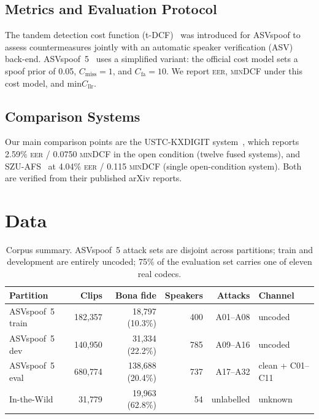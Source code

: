 \documentclass{llncs}
\newcommand{\eer}{\textsc{eer}}
\newcommand{\mindcf}{\textsc{minDCF}}
\begin{document}
\subsection{Metrics and Evaluation Protocol}

The tandem detection cost function (t-DCF)~\cite{tdcf} was introduced for
ASVspoof to assess countermeasures jointly with an automatic speaker verification
(ASV) back-end.  ASVspoof~5~\cite{asvspoof5} uses a simplified variant: the
official cost model sets a spoof prior of 0.05, $C_\text{miss}{=}1$, and
$C_\text{fa}{=}10$.  We report \eer{}, \mindcf{} under this cost model, and
$\text{min}C_\text{llr}$.

\subsection{Comparison Systems}

Our main comparison points are the USTC-KXDIGIT system~\cite{ustc2024}, which
reports 2.59\% \eer{} / 0.0750 \mindcf{} in the open condition (twelve fused
systems), and SZU-AFS~\cite{szuafs} at 4.04\% \eer{} / 0.115 \mindcf{} (single
open-condition system).  Both are verified from their published arXiv reports.

\section{Data}
\label{sec:data}

\begin{table}[t]
\centering
\small
\caption{Corpus summary.  ASVspoof~5 attack sets are disjoint across partitions;
train and development are entirely uncoded; 75\% of the evaluation set carries
one of eleven real codecs.}
\label{tab:data}
\begin{tabular}{lrrrrl}
\toprule
Partition & Clips & Bona fide & Speakers & Attacks & Channel \\
\midrule
ASVspoof~5 train & 182{,}357 & 18{,}797 (10.3\%) & 400 & A01--A08 & uncoded \\
ASVspoof~5 dev   & 140{,}950 & 31{,}334 (22.2\%) & 785 & A09--A16 & uncoded \\
ASVspoof~5 eval  & 680{,}774 & 138{,}688 (20.4\%) & 737 & A17--A32 & clean + C01--C11 \\
In-the-Wild      &  31{,}779 &  19{,}963 (62.8\%) &  54 & unlabelled & unknown \\
\bottomrule
\end{tabular}
\end{table}
\end{document}
